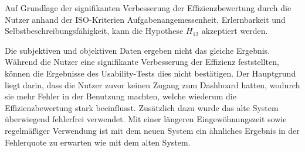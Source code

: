 %
%

Auf Grundlage der signifikanten Verbesserung der Effizienzbewertung durch die Nutzer anhand der ISO-Kriterien Aufgabenangemessenheit, Erlernbarkeit und Selbstbeschreibungsfähigkeit, kann die Hypothese $H_{12}$ akzeptiert werden.

Die subjektiven und objektiven Daten ergeben nicht das gleiche Ergebnis. Während die Nutzer eine signifikante Verbesserung der Effizienz feststellten, können die Ergebnisse des Usability-Tests dies nicht bestätigen. Der Hauptgrund liegt darin, dass die Nutzer zuvor keinen Zugang zum Dash\-board hatten, wodurch sie mehr Fehler in der Benutzung machten, welche wiederum die Effizienzbewertung stark beeinflusst. Zusätzlich dazu wurde das alte System überwiegend fehlerfrei verwendet. Mit einer längeren Eingewöhnungszeit sowie regelmäßiger Verwendung ist mit dem neuen System ein ähnliches Ergebnis in der Fehlerquote zu erwarten wie mit dem alten System.
